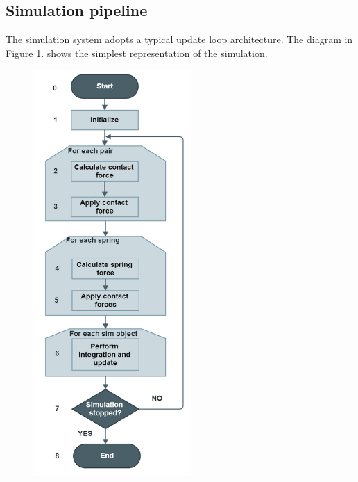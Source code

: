 \subsection{Simulation pipeline}

The simulation system adopts a typical update loop architecture. The diagram in Figure \ref{sim-algorithm}. shows the simplest representation of the simulation.

\begin{figure}
  \centering
    \includegraphics[width=60mm]{sections/methodology/images/basic/sim-algorithm.png}
  \caption[The flow-chart of the simulation update loop.]{\label{sim-algorithm}}
\end{figure}

